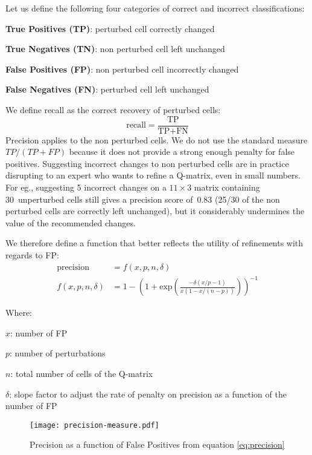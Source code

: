 \documentclass{edm_template}
\begin{document}
Let us define the following four categories of correct and incorrect classifications:
\begin{compactitem}
\item \textbf{True Positives (TP)}: perturbed cell correctly changed
\item \textbf{True Negatives (TN)}: non perturbed cell left unchanged
\item \textbf{False Positives (FP)}: non perturbed cell incorrectly changed
\item \textbf{False Negatives (FN)}: perturbed cell left unchanged
\end{compactitem}
We define recall as the correct recovery of perturbed cells:
 $$ \mathrm{recall}=\frac{\textrm{TP}}{\textrm{TP}+\textrm{FN}}$$
Precision applies to the non perturbed cells.  We do not use the standard measure $TP / (TP + FP)$ because it does not provide a strong enough penalty for false positives. Suggesting incorrect changes to non perturbed cells are in practice disrupting to an expert who wants to refine a Q-matrix, even in small numbers.  For eg., suggesting 5 incorrect changes on a $11\times 3$ matrix containing 30~unperturbed cells still gives a precision score of~0.83 (25/30 of the non perturbed cells are correctly left unchanged), but it considerably undermines the value of the recommended changes.

We therefore define a function that better reflects the utility of refinements with regards to FP:
\begin{align}
\mathrm{precision} & =  f(x, p, n, \delta) \label{eq:precision} \\
f(x, p, n, \delta) & =  1- \left( 1 +  \mathrm{exp}\left( \frac{-\delta (x/p - 1)}{x(1-x/(n-p))} \right) \right)^{-1} \nonumber
\end{align}

Where:
\begin{compactitem}
\item[$x$:] number of FP
\item[$p$:] number of perturbations
\item[$n$:] total number of cells of the Q-matrix
\item[$\delta$:] slope factor to adjust the rate of penalty on precision as a function of the number of FP
\end{compactitem}

\begin{figure}
  \centerline{\texttt{[image: precision-measure.pdf]}}
  \caption{Precision as a function of False Positives from equation \ref{eq:precision}}
  \label{fig:precision}
\end{figure}
\end{document}
